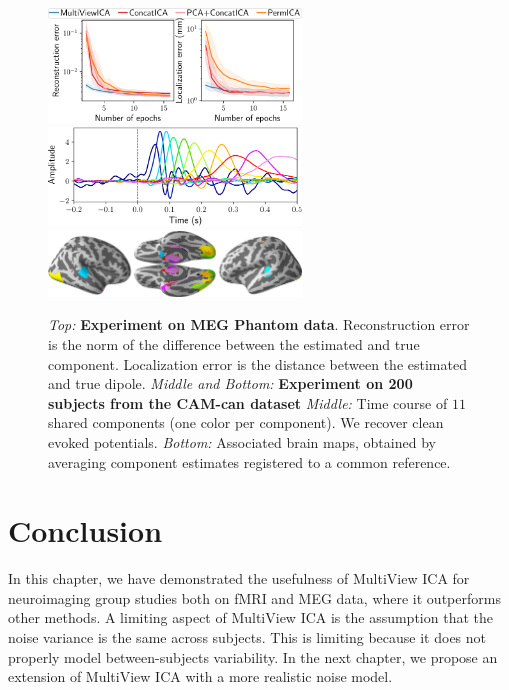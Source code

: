 \begin{figure}
    \centering

          \includegraphics[width=0.6\textwidth]{figures/mvica/phantom.pdf}
          \includegraphics[width=0.6\textwidth]{figures/mvica/camcan_sources.pdf}
          \includegraphics[width=0.6\textwidth]{figures/mvica/montage_all.png}
    \caption{\emph{Top:} \textbf{Experiment on MEG Phantom data}. Reconstruction
      error is the norm of the difference between the estimated and true
      component. Localization error is the distance between the estimated and
      true dipole. \emph{Middle and Bottom:} \textbf{Experiment on 200 subjects from the CAM-can dataset} \emph{Middle:} Time course of $11$ shared components (one color per component). We recover clean evoked potentials. \emph{Bottom:} Associated brain maps, obtained by averaging component estimates registered to a common reference.}
    \label{fig:meg}
\end{figure}

%
%


\section{Conclusion}
In this chapter, we have demonstrated the usefulness of MultiView ICA for neuroimaging group studies both on fMRI and MEG data, where it outperforms other methods.
%
A limiting aspect of MultiView ICA is the assumption that the noise
variance is the same across subjects. This is limiting because it does not
properly model between-subjects variability.
%
In the next chapter, we propose an extension of MultiView ICA with a more realistic
noise model.

